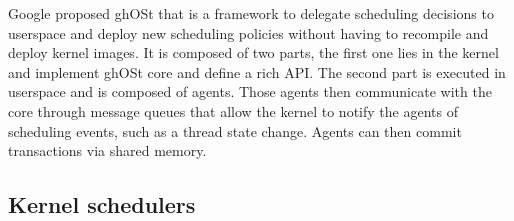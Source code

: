 \par Google proposed ghOSt\cite{ghost} that is a framework to delegate scheduling decisions to userspace and deploy new scheduling policies without having to recompile and deploy kernel images. It is composed of two parts, the first one lies in the kernel and implement ghOSt core and define a rich API. The second part is executed in userspace and is composed of agents. Those agents then communicate with the core through message queues that allow the kernel to notify the agents of scheduling events, such as a thread state change. Agents can then commit transactions via shared memory. 




\subsection{Kernel schedulers}


